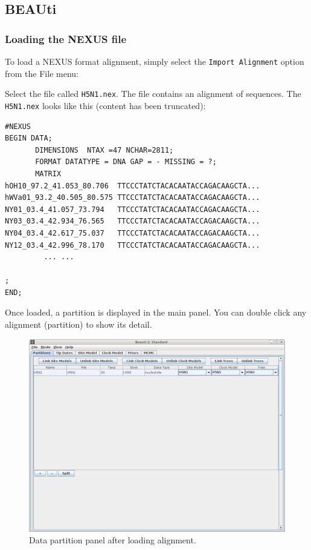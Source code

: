 \documentclass{article}
\begin{document}
\subsection*{BEAUti}


\subsubsection*{Loading the NEXUS file }

To load a NEXUS format alignment, simply select the \texttt{Import
Alignment} option from the File menu: 

Select the file called \texttt{H5N1.nex}. The file contains an alignment of sequences. The \texttt{H5N1.nex} looks like this (content has been truncated):

\begin{verbatim}
#NEXUS
BEGIN DATA;
       DIMENSIONS  NTAX =47 NCHAR=2811;
       FORMAT DATATYPE = DNA GAP = - MISSING = ?;
       MATRIX 	
hOH10_97.2_41.053_80.706  TTCCCTATCTACACAATACCAGACAAGCTA...
hWVa01_93.2_40.505_80.575 TTCCCTATCTACACAATACCAGACAAGCTA...
NY01_03.4_41.057_73.794   TTCCCTATCTACACAATACCAGACAAGCTA...
NY03_03.4_42.934_76.565   TTCCCTATCTACACAATACCAGACAAGCTA...
NY04_03.4_42.617_75.037   TTCCCTATCTACACAATACCAGACAAGCTA...
NY12_03.4_42.996_78.170   TTCCCTATCTACACAATACCAGACAAGCTA...
         ... ...

;
END;
\end{verbatim}

\medskip{}

Once loaded, a partition is displayed in the main panel.
You can double click any alignment (partition) to show its detail.

\begin{figure}
\begin{center}

\includegraphics[scale=0.4]{figures/BEAUti_DataPartitions}

\end{center}
\caption{\label{fig.datapartition} Data partition panel after loading alignment.}
\end{figure}
\end{document}
